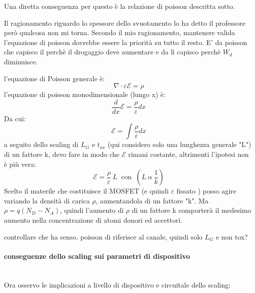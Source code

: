 Una diretta conseguenza per questo è la relazione di poisson descritta sotto.\\
%
\begin{citbox}
    Il ragionamento riguardo lo spessore dello svuotamento lo ha detto il professore però qualcosa non mi torna. Secondo il mio ragionamento, mantenere valida l'equazione di poisson dovrebbe essere la priorità su tutto il resto. E' da poisson che capisco il perchè il drogaggio deve aumentare e da lì capisco perchè $W_d$ diminuisce.
\end{citbox}
%

\begin{ripasso}[]
    l'equazione di Poisson generale è:
    \begin{equation*}
        \nabla \cdot \varepsilon \mathcal{ E} = \rho
    \end{equation*}
    l'equazione di poisson monodimensionale (lungo x) è:
    \begin{equation*}
    \dfrac{d}{dx}\mathcal{E} = \dfrac{\rho}{\varepsilon}dx
    \end{equation*}
    Da cui:
    \begin{equation*}
    \mathcal{E}=\int \dfrac{\rho}{\varepsilon}dx
    \end{equation*}
    a seguito dello scaling di $L_G$ e $t_{ox}$ (qui considero solo una lunghezza generale "L") di un fattore k, devo fare in modo che $\mathcal{E}$ rimani costante, altrimenti l'ipotesi non è più vera:
    \begin{equation*}
        \mathcal{E}=\dfrac{\rho}{\varepsilon} \ L \ \text{ con }\ (L \ \alpha \ \frac{1}{k})
    \end{equation*}
    Scelto il materile che costituisce il MOSFET (e quindi $\varepsilon$ fissato ) posso agire variando la densità di carica $\rho$, aumentandola di un fattore "k". Ma $\rho=q(N_D-N_A)$, quindi l'aumento di $\rho$ di un fattore k comporterà il medesimo aumento nella concentrazione di atomi donori ed accettori.

    \begin{ricevimento}
        controllare che ha senso. poisson di riferisce al canale, quindi solo $L_G$ e non tox?
    \end{ricevimento}
\end{ripasso}
%
\cleardoublepage
\paragraph{conseguenze dello scaling sui parametri di dispositivo} \mbox{}\\
Ora osservo le implicazioni a livello di dispositivo e circuitale dello scaling:

